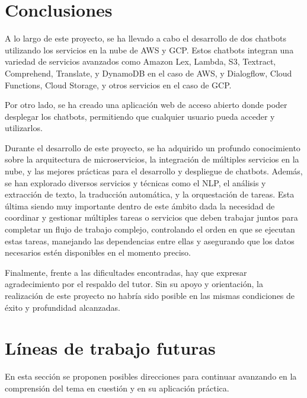 
\section{Conclusiones}
A lo largo de este proyecto, se ha llevado a cabo el desarrollo de dos chatbots utilizando los servicios en la nube de AWS y GCP. Estos chatbots integran una variedad de servicios avanzados como Amazon Lex, Lambda, S3, Textract, Comprehend, Translate, y DynamoDB en el caso de AWS, y Dialogflow, Cloud Functions, Cloud Storage, y otros servicios en el caso de GCP.

Por otro lado, se ha creado una aplicación web de acceso abierto donde poder desplegar los chatbots, permitiendo que cualquier usuario pueda acceder y utilizarlos.

Durante el desarrollo de este proyecto, se ha adquirido un profundo conocimiento sobre la arquitectura de microservicios, la integración de múltiples servicios en la nube, y las mejores prácticas para el desarrollo y despliegue de chatbots. Además, se han explorado diversos servicios y técnicas como el NLP, el análisis y extracción de texto, la traducción automática, y la orquestación de tareas. Esta última siendo muy importante dentro de este ámbito dada la necesidad de coordinar y gestionar múltiples tareas o servicios que deben trabajar juntos para completar un flujo de trabajo complejo, controlando el orden en que se ejecutan estas tareas, manejando las dependencias entre ellas y asegurando que los datos necesarios estén disponibles en el momento preciso.

Finalmente, frente a las dificultades encontradas, hay que expresar agradecimiento por el respaldo del tutor. Sin su apoyo y orientación, la realización de este proyecto no habría sido posible en las mismas condiciones de éxito y profundidad alcanzadas.

\section{Líneas de trabajo futuras} 

En esta sección se proponen posibles direcciones para continuar avanzando en la comprensión del tema en cuestión y en su aplicación práctica.

